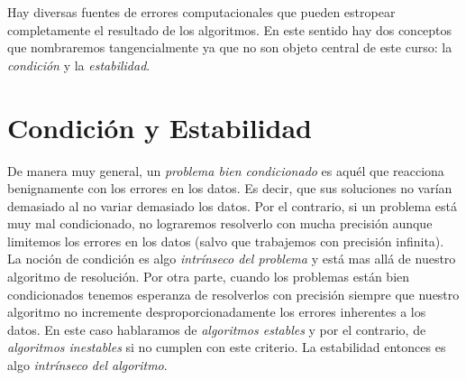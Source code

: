 Hay diversas fuentes de errores computacionales que pueden estropear completamente el resultado de los algoritmos. En este sentido hay dos conceptos que nombraremos tangencialmente ya que no son objeto central de este curso: la \emph{condición} y la \emph{estabilidad}.
\section{Condición y Estabilidad}
De manera muy general, un \emph{problema bien condicionado} es aquél que reacciona benignamente con los errores en los datos. Es decir, que sus soluciones no varían demasiado al no variar demasiado los datos. Por el contrario, si un problema está muy mal condicionado, no lograremos resolverlo con mucha precisión aunque limitemos los errores en los datos (salvo que trabajemos con precisión infinita). La noción de condición es algo \emph{intrínseco del problema} y está mas allá de nuestro algoritmo de resolución.  Por otra parte, cuando los problemas están bien condicionados tenemos esperanza de resolverlos con precisión siempre que nuestro algoritmo no incremente desproporcionadamente los errores inherentes a los datos. En este caso hablaramos de \emph{algoritmos estables} y por el contrario, de  \emph{algoritmos inestables} si no cumplen con este criterio. La estabilidad entonces es algo \emph{intrínseco del algoritmo}.




